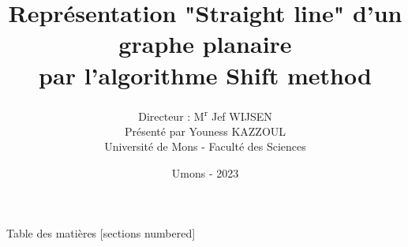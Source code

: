 \documentclass[10pt]{beamer}
\title[Graphe planaire représentation straight line]{Représentation "Straight line" d'un graphe planaire \\ par l'algorithme Shift method}
\author[Youness KAZZOUL]{ 
	Directeur : M\textsuperscript{r} Jef \textsc{WIJSEN} \\[0.1cm] 
	Présenté par Youness \textsc{KAZZOUL} \\[1cm] 
	Université de Mons - Faculté des Sciences}
\date[Umons - 2023]{Umons - 2023}
\begin{document}
	

\begin{frame}
 \maketitle	
\end{frame}


\begin{frame}{Table des matières}
[sections numbered]
\tableofcontents%
~\end{frame}

\end{document}
